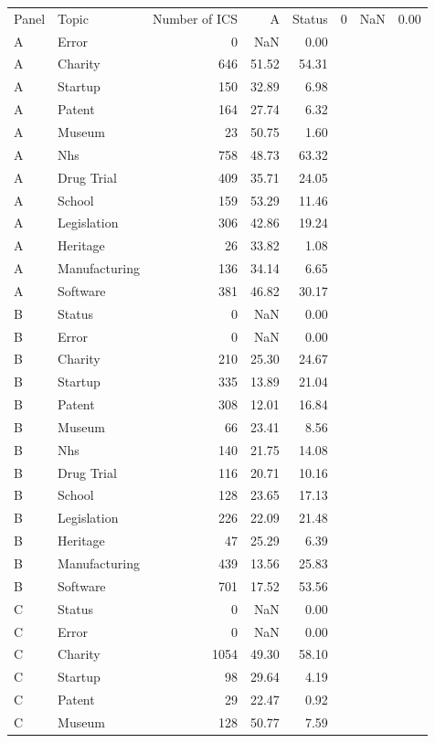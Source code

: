 \begin{tabular}{llrrr}
\toprule
Panel & Topic & Number of ICS & %
\midrule
A & Status & 0 & NaN & 0.00 \\
A & Error & 0 & NaN & 0.00 \\
A & Charity & 646 & 51.52 & 54.31 \\
A & Startup & 150 & 32.89 & 6.98 \\
A & Patent & 164 & 27.74 & 6.32 \\
A & Museum & 23 & 50.75 & 1.60 \\
A & Nhs & 758 & 48.73 & 63.32 \\
A & Drug Trial & 409 & 35.71 & 24.05 \\
A & School & 159 & 53.29 & 11.46 \\
A & Legislation & 306 & 42.86 & 19.24 \\
A & Heritage & 26 & 33.82 & 1.08 \\
A & Manufacturing & 136 & 34.14 & 6.65 \\
A & Software & 381 & 46.82 & 30.17 \\
B & Status & 0 & NaN & 0.00 \\
B & Error & 0 & NaN & 0.00 \\
B & Charity & 210 & 25.30 & 24.67 \\
B & Startup & 335 & 13.89 & 21.04 \\
B & Patent & 308 & 12.01 & 16.84 \\
B & Museum & 66 & 23.41 & 8.56 \\
B & Nhs & 140 & 21.75 & 14.08 \\
B & Drug Trial & 116 & 20.71 & 10.16 \\
B & School & 128 & 23.65 & 17.13 \\
B & Legislation & 226 & 22.09 & 21.48 \\
B & Heritage & 47 & 25.29 & 6.39 \\
B & Manufacturing & 439 & 13.56 & 25.83 \\
B & Software & 701 & 17.52 & 53.56 \\
C & Status & 0 & NaN & 0.00 \\
C & Error & 0 & NaN & 0.00 \\
C & Charity & 1054 & 49.30 & 58.10 \\
C & Startup & 98 & 29.64 & 4.19 \\
C & Patent & 29 & 22.47 & 0.92 \\
C & Museum & 128 & 50.77 & 7.59 \\

\end{tabular}
